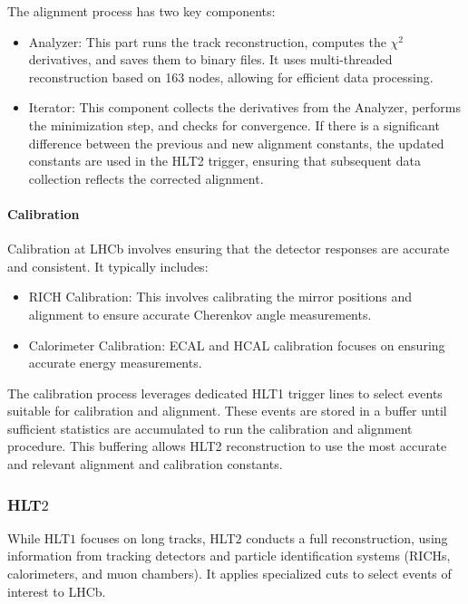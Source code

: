The alignment process has two key components\cite{Saur:20230E}:
\begin{itemize}
\item Analyzer: This part runs the track reconstruction, computes the $\chi^2$ derivatives, and saves them to binary files. It uses multi-threaded reconstruction based on 163 nodes, allowing for efficient data processing.
\item Iterator: This component collects the derivatives from the Analyzer, performs the minimization step, and checks for convergence. If there is a significant difference between the previous and new alignment constants, the updated constants are used in the HLT2 trigger, ensuring that subsequent data collection reflects the corrected alignment.
\end{itemize}
\paragraph{Calibration}
Calibration at LHCb involves ensuring that the detector responses are accurate and consistent. It typically includes:
\begin{itemize}
\item RICH Calibration: This involves calibrating the mirror positions and alignment to ensure accurate Cherenkov angle measurements.
\item Calorimeter Calibration: ECAL and HCAL calibration focuses on ensuring accurate energy measurements.
\end{itemize}
The calibration process leverages dedicated HLT1 trigger lines to select events suitable for calibration and alignment. These events are stored in a buffer until sufficient statistics are accumulated to run the calibration and alignment procedure. This buffering allows HLT2 reconstruction to use the most accurate and relevant alignment and calibration constants.
\subsubsection{HLT$2$}
While HLT$1$ focuses on long tracks, HLT$2$ conducts a full reconstruction, using information from tracking detectors and particle identification systems (RICHs, calorimeters, and muon chambers). It applies specialized cuts to select events of interest to LHCb.

